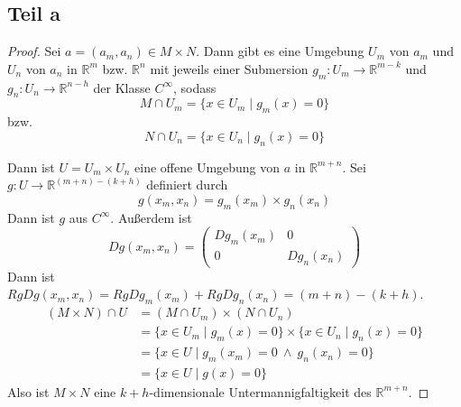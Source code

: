 \documentclass[10pt,a4paper]{article}
\begin{document}
\subsection{Teil a}
\begin{proof}
  Sei $a = (a_{m}, a_{n}) \in M \times N$.
  Dann gibt es eine Umgebung $U_{m}$ von $a_{m}$ und $U_{n}$ von $a_{n}$ in $\mathbb{R}^{m}$ bzw. $\mathbb{R}^{n}$ mit jeweils einer Submersion $g_{m} : U_{m} \rightarrow \mathbb{R}^{m - k}$ und $g_{n} : U_{n} \rightarrow \mathbb{R}^{n - h}$ der Klasse $C^{\infty}$, sodass
  \begin{equation}
    M \cap U_{m} = \{ x \in U_{m} \mid g_{m}(x) = 0 \}
  \end{equation}
  bzw.
  \begin{equation}
    N \cap U_{n} = \{ x \in U_{n} \mid g_{n}(x) = 0 \}
  \end{equation}

  Dann ist $U = U_{m} \times U_{n}$ eine offene Umgebung von $a$ in $\mathbb{R}^{m + n}$.
  Sei $g : U \rightarrow \mathbb{R}^{(m + n) - (k + h)}$ definiert durch
  \begin{equation}
    g(x_{m}, x_{n}) = g_{m}(x_{m}) \times g_{n}(x_{n})
  \end{equation}
  Dann ist $g$ aus $C^{\infty}$.
  Außerdem ist
  \begin{equation}
    Dg(x_{m}, x_{n}) = \begin{pmatrix}
      Dg_{m}(x_{m}) & 0\\
      0 & Dg_{n}(x_{n})
    \end{pmatrix}
  \end{equation}
  Dann ist $Rg Dg(x_{m}, x_{n}) = Rg Dg_{m}(x_{m}) + Rg Dg_{n}(x_{n}) = (m + n) - (k + h)$.
  \begin{align*}
    (M \times N) \cap U & = (M \cap U_{m}) \times (N \cap U_{n})\\
    & = \{ x \in U_{m} \mid g_{m}(x) = 0 \} \times \{ x \in U_{n} \mid g_{n}(x) = 0 \}\\
    & = \{ x \in U \mid g_{m}(x_{m}) = 0\ \land\ g_{n}(x_{n}) = 0 \}\\
    & = \{ x \in U \mid g(x) = 0 \}
  \end{align*}
  Also ist $M \times N$ eine $k + h$-dimensionale Untermannigfaltigkeit des $\mathbb{R}^{m + n}$.
\end{proof}
\end{document}

